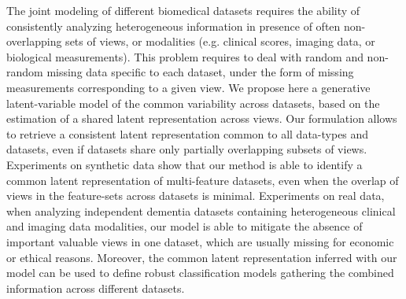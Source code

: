The joint modeling of different biomedical datasets requires the ability of consistently analyzing heterogeneous information in presence of often non-overlapping sets of views, or modalities (e.g. clinical scores, imaging data, or biological measurements).
This problem requires to deal with random and non-random missing data specific to each dataset, under the form of missing measurements corresponding to a given view.
%
We propose here a generative latent-variable model of the common variability across datasets, based on the estimation of a shared latent representation across views.
Our formulation allows to retrieve a consistent latent representation common to all data-types and datasets, even if datasets share only partially overlapping subsets of views.
%
Experiments on synthetic data show that our method is able to identify a common latent representation of multi-feature datasets, even when the overlap of views in the feature-sets across datasets is minimal.
%
Experiments on real data, when analyzing independent dementia datasets containing heterogeneous clinical and imaging data modalities, our model is able to mitigate the absence of important valuable views in one dataset, which are usually missing for economic or ethical reasons.
Moreover, the common latent representation inferred with our model can be used to define robust classification models gathering the combined information across different datasets.
